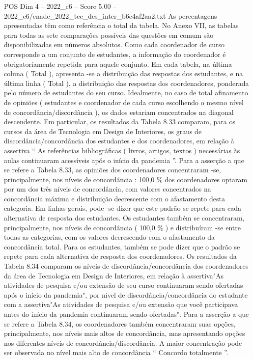 \begin{textsample}{POS Dim 4 – 2022\_c6 – Score 5.00 – 2022\_c6/enade\_2022\_tec\_des\_inter\_b6c4af2aa2.txt}
As percentagens apresentadas têm como referência o total da tabela.
No Anexo VII, as tabelas para todas as sete comparações possíveis das questões em comum são disponibilizadas em números absolutos.
Como cada coordenador de curso corresponde a um conjunto de estudantes, a informação do coordenador é obrigatoriamente repetida para aquele conjunto.
Em cada tabela, na última coluna ( Total ), apresenta -se a distribuição das respostas dos estudantes, e na última linha ( Total ), a distribuição das respostas dos coordenadores, ponderada pelo número de estudantes do seu curso.
Idealmente, no caso de total afinamento de opiniões ( estudantes e coordenador de cada curso escolhendo o mesmo nível de concordância/discordância ), os dados estariam concentrados na diagonal descendente.
Em particular, os resultados da Tabela 8.33 comparam, para os cursos da área de Tecnologia em Design de Interiores, os graus de discordância/concordância dos estudantes e dos coordenadores, em relação à assertiva “ As referências bibliográficas ( livros, artigos, textos ) necessárias às aulas continuaram acessíveis após o início da pandemia ”.
Para a asserção a que se refere a Tabela 8.33, as opiniões dos coordenadores concentraram -se, principalmente, nos níveis de concordância : 100,0 \% dos coordenadores optaram por um dos três níveis de concordância, com valores concentrados na concordância máxima e distribuição decrescente com o afastamento desta categoria.
Em linhas gerais, pode -se dizer que este padrão se repete para cada alternativa de resposta dos estudantes.
Os estudantes também se concentraram, principalmente, nos níveis de concordância ( 100,0 \% ) e distribuíram -se entre todas as categorias, com os valores decrescendo com o afastamento da concordância total.
Para os estudantes, também se pode dizer que o padrão se repete para cada alternativa de resposta dos coordenadores.
Os resultados da Tabela 8.34 comparam os níveis de discordância/concordância dos coordenadores da área de Tecnologia em Design de Interiores, em relação à assertiva"As atividades de pesquisa e/ou extensão de seu curso continuaram sendo ofertadas após o início da pandemia", por nível de discordância/concordância do estudante com a assertiva"As atividades de pesquisa e/ou extensão que você participava antes do início da pandemia continuaram sendo ofertadas".
Para a asserção a que se refere a Tabela 8.34, os coordenadores também concentraram suas opções, principalmente, nos níveis mais altos de concordância, mas apresentando opções nos diferentes níveis de concordância/discordância.
A maior concentração pode ser observada no nível mais alto de concordância “ Concordo totalmente ”.

\end{textsample}
